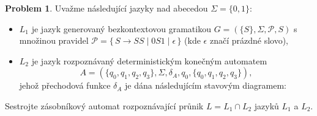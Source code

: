 \documentclass[a4paper,12pt]{article}
\theoremstyle{definition}
\newtheorem{problem}{Problem}
\begin{document}
\begin{problem}
    
    Uvažme následující jazyky nad abecedou $\Sigma = \{0,1\}$:
    \begin{itemize}
        \item $L_1$ je jazyk generovaný bezkontextovou gramatikou $G = (\{S\}, \Sigma, \mathcal P, S)$ s množinou pravidel $\mathcal P = \{\,S \rightarrow SS \mid 0S1 \mid \epsilon\,\}$ (kde $\epsilon$ značí prázdné slovo),
        \item $L_2$ je jazyk rozpoznávaný deterministickým konečným automatem 
        $$
        A=(\{q_0,q_1,q_2,q_3\},\Sigma,\delta_A,q_0,\{q_0,q_1,q_2,q_3\}),
        $$ jehož přechodová funkce $\delta_A$ je dána následujícím stavovým diagramem:
        \begin{center}
        \end{center}
        
    \end{itemize}
    Sestrojte zásobníkový automat rozpoznávající průnik $L=L_1\cap L_2$ jazyků $L_1$ a $L_2$.

\end{problem}
\end{document}
